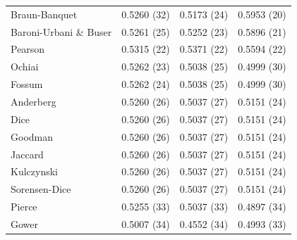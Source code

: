 \begin{table}[t]
{\begin{tabular}{lccc}
Braun-Banquet & 0.5260 (32) & 0.5173 (24) & 0.5953 (20) \\
Baroni-Urbani \& Buser & 0.5261 (25) & 0.5252 (23) & 0.5896 (21) \\
Pearson & 0.5315 (22) & 0.5371 (22) & 0.5594 (22) \\
Ochiai & 0.5262 (23) & 0.5038 (25) & 0.4999 (30) \\
Fossum & 0.5262 (24) & 0.5038 (25) & 0.4999 (30) \\
Anderberg & 0.5260 (26) & 0.5037 (27) & 0.5151 (24) \\
Dice & 0.5260 (26) & 0.5037 (27) & 0.5151 (24) \\
Goodman & 0.5260 (26) & 0.5037 (27) & 0.5151 (24) \\
Jaccard & 0.5260 (26) & 0.5037 (27) & 0.5151 (24) \\
Kulczynski & 0.5260 (26) & 0.5037 (27) & 0.5151 (24) \\
Sorensen-Dice & 0.5260 (26) & 0.5037 (27) & 0.5151 (24) \\
Pierce & 0.5255 (33) & 0.5037 (33) & 0.4897 (34) \\
Gower & 0.5007 (34) & 0.4552 (34) & 0.4993 (33) \\
\bottomrule
\end{tabular}
}
\end{table}
